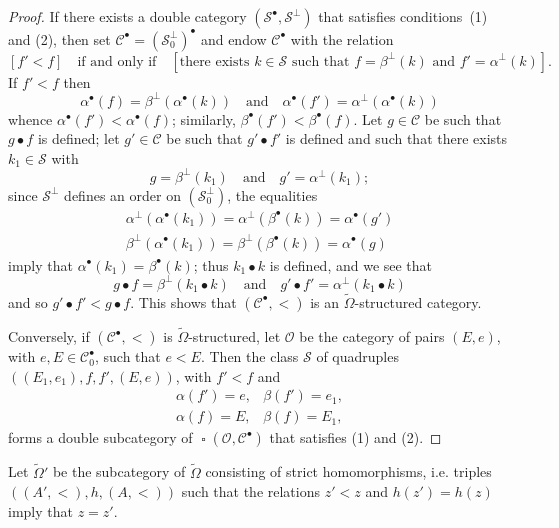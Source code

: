 \documentclass[a4paper,fleqn]{article}
\theoremstyle{plain}
\theoremstyle{definition}
\newcommand{\textand}{\quad\text{and}\quad}
\newcommand{\CC}{\mathcal{C}}
\renewcommand{\SS}{\mathcal{S}}
\DeclareMathOperator{\sq}{\square}
\begin{document}
\begin{proof}
  If there exists a double category $(\SS^\bullet,\SS^\perp)$ that satisfies conditions~(1) and (2), then set $\CC^\bullet=(\SS_0^\perp)^\bullet$ and endow $\CC^\bullet$ with the relation
  \[
    [f' < f]
    \quad\text{if and only if}\quad
    [\text{there exists $k\in\SS$ such that $f=\beta^\perp(k)$ and $f'=\alpha^\perp(k)$}].
  \]
  If $f'<f$ then
  \[
    \alpha^\bullet(f) = \beta^\perp(\alpha^\bullet(k))
    \textand
    \alpha^\bullet(f') = \alpha^\perp(\alpha^\bullet(k))
  \]
  whence $\alpha^\bullet(f')<\alpha^\bullet(f)$;
  similarly, $\beta^\bullet(f')<\beta^\bullet(f)$.
  Let $g\in\CC$ be such that $g\bullet f$ is defined;
  let $g'\in\CC$ be such that $g'\bullet f'$ is defined and such that there exists $k_1\in\SS$ with
  \[
    g=\beta^\perp(k_1)
    \textand
    g'=\alpha^\perp(k_1);
  \]
  since $\SS^\perp$ defines an order on $(\SS_0^\perp)$, the equalities
  \[
    \begin{gathered}
      \alpha^\perp(\alpha^\bullet(k_1))
      = \alpha^\perp(\beta^\bullet(k))
      = \alpha^\bullet(g')
    \\\beta^\perp(\alpha^\bullet(k_1))
      = \beta^\perp(\beta^\bullet(k))
      = \alpha^\bullet(g)
    \end{gathered}
  \]
  imply that $\alpha^\bullet(k_1)=\beta^\bullet(k)$;
  thus $k_1\bullet k$ is defined, and we see that
  \[
    g\bullet f = \beta^\perp(k_1\bullet k)
    \textand
    g'\bullet f' = \alpha^\perp(k_1\bullet k)
  \]
  and so $g'\bullet f'<g\bullet f$.
  This shows that $(\CC^\bullet,<)$ is an $\widetilde{\Omega}$-structured category.

  Conversely, if $(\CC^\bullet,<)$ is $\widetilde{\Omega}$-structured, let $\mathcal{O}$ be the category of pairs $(E,e)$, with $e,E\in\CC_0^\bullet$, such that $e<E$.
  Then the class $\SS$ of quadruples $((E_1,e_1),f,f',(E,e))$, with $f'<f$ and
  \[
    \begin{array}{cc}
      \alpha(f')=e,
      & \beta(f')=e_1,
    \\\alpha(f)=E,
      &\beta(f)=E_1,
    \end{array}
  \]
  forms a double subcategory of $\sq(\mathcal{O},\CC^\bullet)$ that satisfies (1) and (2).
\end{proof}

Let $\widetilde{\Omega}'$ be the subcategory of $\widetilde{\Omega}$ consisting of strict homomorphisms, i.e. triples $((A',<),h,(A,<))$ such that the relations $z'<z$ and $h(z')=h(z)$ imply that $z=z'$.
\end{document}
